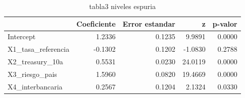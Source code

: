 \begin{table}
\caption{tabla3 niveles espuria}
\begin{tabular}{lrrrr}
\toprule
 & Coeficiente & Error estandar & z & p-valor \\
\midrule
Intercept & 1.2336 & 0.1235 & 9.9891 & 0.0000 \\
X1_tasa_referencia & -0.1302 & 0.1202 & -1.0830 & 0.2788 \\
X2_treasury_10a & 0.5531 & 0.0230 & 24.0119 & 0.0000 \\
X3_riesgo_pais & 1.5960 & 0.0820 & 19.4669 & 0.0000 \\
X4_interbancaria & 0.2567 & 0.1204 & 2.1324 & 0.0330 \\
\bottomrule
\end{tabular}
\end{table}
